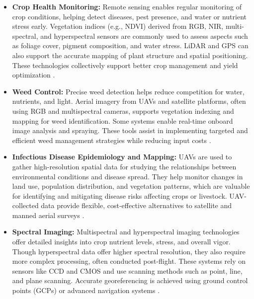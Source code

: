 \begin{itemize}[leftmargin=1.5em]

    \item \textbf{Crop Health Monitoring:} Remote sensing enables regular monitoring of crop conditions, helping detect diseases, pest presence, and water or nutrient stress early. Vegetation indices (e.g., NDVI) derived from RGB, NIR, multi-spectral, and hyperspectral sensors are commonly used to assess aspects such as foliage cover, pigment composition, and water stress. LiDAR and GPS can also support the accurate mapping of plant structure and spatial positioning. These technologies collectively support better crop management and yield optimization \parencite{phang2023satellite}.
    
    \item \textbf{Weed Control:} Precise weed detection helps reduce competition for water, nutrients, and light. Aerial imagery from UAVs and satellite platforms, often using RGB and multispectral cameras, supports vegetation indexing and mapping for weed identification. Some systems enable real-time onboard image analysis and spraying. These tools assist in implementing targeted and efficient weed management strategies while reducing input costs \parencite{phang2023satellite}.
    
    \item \textbf{Infectious Disease Epidemiology and Mapping:} UAVs are used to gather high-resolution spatial data for studying the relationships between environmental conditions and disease spread. They help monitor changes in land use, population distribution, and vegetation patterns, which are valuable for identifying and mitigating disease risks affecting crops or livestock. UAV-collected data provide flexible, cost-effective alternatives to satellite and manned aerial surveys \parencite{phang2023satellite}.
    
    \item \textbf{Spectral Imaging:} Multispectral and hyperspectral imaging technologies offer detailed insights into crop nutrient levels, stress, and overall vigor. Though hyperspectral data offer higher spectral resolution, they also require more complex processing, often conducted post-flight. These systems rely on sensors like CCD and CMOS and use scanning methods such as point, line, and plane scanning. Accurate georeferencing is achieved using ground control points (GCPs) or advanced navigation systems \parencite{phang2023satellite}.
    
\end{itemize}

